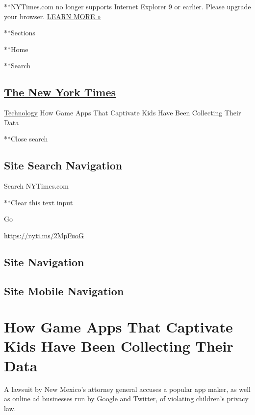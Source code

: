  **NYTimes.com no longer supports Internet Explorer 9 or earlier. Please
upgrade your browser.
\href{http://www.nytimes.com/content/help/site/ie9-support.html}{LEARN
MORE »}

**Sections

**Home

**Search

\hypertarget{the-new-york-times}{%
\subsection{\texorpdfstring{\href{http://www.nytimes.com/}{The New York
Times}}{The New York Times}}\label{the-new-york-times}}

 \href{https://www.nytimes.com/section/technology}{Technology}
\textbar{}How Game Apps That Captivate Kids Have Been Collecting Their
Data

**Close search

\hypertarget{site-search-navigation}{%
\subsection{Site Search Navigation}\label{site-search-navigation}}

Search NYTimes.com

**Clear this text input

Go

\url{https://nyti.ms/2MpFuoG}

\hypertarget{site-navigation}{%
\subsection{Site Navigation}\label{site-navigation}}

\hypertarget{site-mobile-navigation}{%
\subsection{Site Mobile Navigation}\label{site-mobile-navigation}}

\hypertarget{how-game-apps-that-captivate-kids-have-been-collecting-their-data}{%
\section{How Game Apps That Captivate Kids Have Been Collecting Their
Data}\label{how-game-apps-that-captivate-kids-have-been-collecting-their-data}}

A lawsuit by New Mexico's attorney general accuses a popular app maker,
as well as online ad businesses run by Google and Twitter, of violating
children's privacy law.

